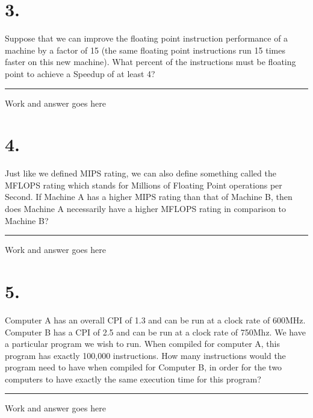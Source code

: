 \documentclass{article}
\newenvironment{shadedbox}{\begin{tcolorbox}[width=\linewidth, sharp corners=all, colback=white!95!black]}{\end{tcolorbox}}
\begin{document}
\pagebreak

\section*{3.}
Suppose that we can improve the floating point instruction performance of a machine by a factor of 15 (the same floating point instructions run 15 times faster on this new machine). What percent of the instructions must be floating point to achieve a Speedup of at least 4?
\vspace{0.3cm}
\hrule
\vspace{0.3cm}
\begin{shadedbox}
Work and answer goes here
\end{shadedbox}

\pagebreak

\section*{4.}
Just like we defined MIPS rating, we can also define something called the MFLOPS rating which stands for Millions of Floating Point operations per Second. If Machine A has a higher MIPS rating than that of Machine B, then does Machine A necessarily have a higher MFLOPS rating in comparison to Machine B? 
\vspace{0.3cm}
\hrule
\vspace{0.3cm}
\begin{shadedbox}
Work and answer goes here
\end{shadedbox}

\pagebreak

\section*{5.}
Computer A has an overall CPI of 1.3 and can be run at a clock rate of 600MHz. Computer B has a CPI of 2.5 and can be run at a clock rate of 750Mhz. We have a particular program we wish to run. When compiled for computer A, this program has exactly 100,000 instructions. How many instructions would the program need to have when compiled for Computer B, in order for the two computers to have exactly the same execution time for this program?
\vspace{0.3cm}
\hrule
\vspace{0.3cm}
\begin{shadedbox}
Work and answer goes here
\end{shadedbox}
\end{document}
